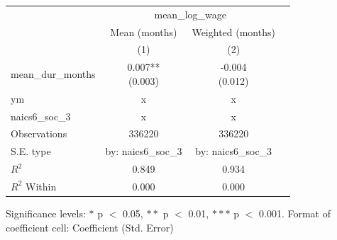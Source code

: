 \renewcommand\cellalign{t}
\begin{threeparttable}
\begin{tabular}{lccc}
\toprule
 & \multicolumn{2}{c}{mean_log_wage} \\
\cmidrule(lr){2-3} 
 & Mean (months) & Weighted (months) \\
 & (1) & (2) \\
\midrule
\addlinespace
mean_dur_months & \makecell{0.007** \\ (0.003)} & \makecell{-0.004 \\ (0.012)} \\
\midrule
\addlinespace
ym & x & x \\
naics6_soc_3 & x & x \\
\midrule
\addlinespace
Observations & 336220 & 336220 \\
S.E. type & by: naics6_soc_3 & by: naics6_soc_3 \\
$R^2$ & 0.849 & 0.934 \\
$R^2$ Within & 0.000 & 0.000 \\
\bottomrule
\end{tabular}
\footnotesize Significance levels: $*$ p $<$ 0.05, $**$ p $<$ 0.01, $***$ p $<$ 0.001. Format of coefficient cell: Coefficient 
 (Std. Error)
\end{threeparttable}